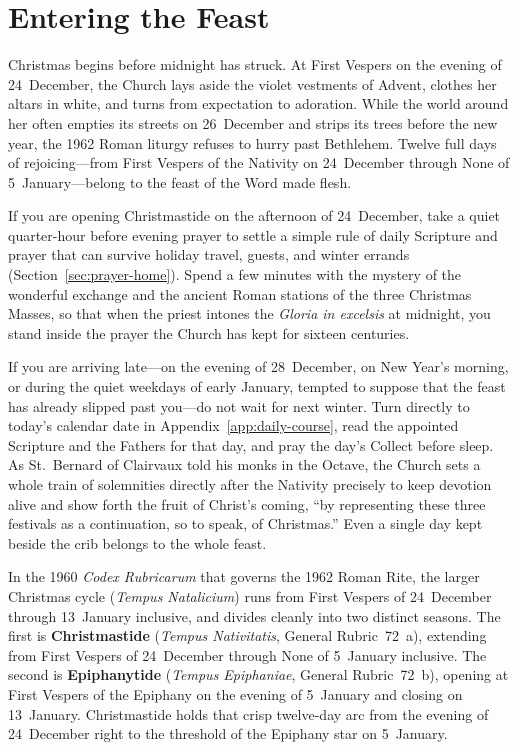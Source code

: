 \section{Entering the Feast}\label{sec:entering}

Christmas begins before midnight has struck. At First Vespers on the evening of
24~December, the Church lays aside the violet vestments of Advent, clothes her
altars in white, and turns from expectation to adoration. While the world around
her often empties its streets on 26~December and strips its trees before the new
year, the 1962 Roman liturgy refuses to hurry past Bethlehem. Twelve full days
of rejoicing---from First Vespers of the Nativity on 24~December through None of
5~January---belong to the feast of the Word made flesh.

If you are opening Christmastide on the afternoon of 24~December, take a quiet
quarter-hour before evening prayer to settle a simple rule of daily Scripture
and prayer that can survive holiday travel, guests, and winter errands
(Section~\ref{sec:prayer-home}). Spend a few minutes with the mystery of the
wonderful exchange and the ancient Roman stations of the three Christmas Masses,
so that when the priest intones the \textit{Gloria in excelsis} at midnight, you
stand inside the prayer the Church has kept for sixteen centuries.

If you are arriving late---on the evening of 28~December, on New Year's morning,
or during the quiet weekdays of early January, tempted to suppose that the feast
has already slipped past you---do not wait for next winter. Turn directly to
today's calendar date in Appendix~\ref{app:daily-course}, read the appointed
Scripture and the Fathers for that day, and pray the day's Collect before sleep.
As St.~Bernard of Clairvaux told his monks in the Octave, the Church sets a
whole train of solemnities directly after the Nativity precisely to keep
devotion alive and show forth the fruit of Christ's coming, ``by representing
these three festivals as a continuation, so to speak, of Christmas.'' Even a
single day kept beside the crib belongs to the whole feast.

In the 1960 \textit{Codex Rubricarum} that governs the 1962 Roman Rite, the
larger Christmas cycle (\textit{Tempus Natalicium}) runs from First Vespers of
24~December through 13~January inclusive, and divides cleanly into two distinct
seasons. The first is \textbf{Christmastide} (\textit{Tempus Nativitatis},
General Rubric~72~a), extending from First Vespers of 24~December through None
of 5~January inclusive. The second is \textbf{Epiphanytide} (\textit{Tempus
Epiphaniae}, General Rubric~72~b), opening at First Vespers of the Epiphany on
the evening of 5~January and closing on 13~January. Christmastide holds that
crisp twelve-day arc from the evening of 24~December right to the threshold of
the Epiphany star on 5~January.

